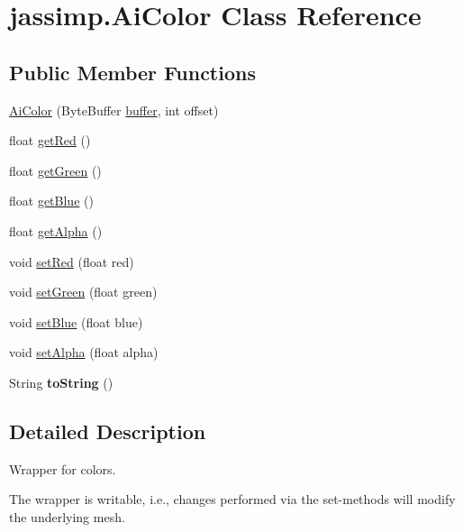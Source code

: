 \hypertarget{classjassimp_1_1_ai_color}{\section{jassimp.\+Ai\+Color Class Reference}
\label{classjassimp_1_1_ai_color}
}
\subsection*{Public Member Functions}
\begin{DoxyCompactItemize}
\item 
\hyperlink{classjassimp_1_1_ai_color_ad541c020e9793504776c0176d603194b}{Ai\+Color} (Byte\+Buffer \hyperlink{structbuffer}{buffer}, int offset)
\item 
float \hyperlink{classjassimp_1_1_ai_color_a0ff56d427f6989f83e02602758e8222a}{get\+Red} ()
\item 
float \hyperlink{classjassimp_1_1_ai_color_a610254e9e466640095a3353e596fc782}{get\+Green} ()
\item 
float \hyperlink{classjassimp_1_1_ai_color_a938bb9ab972c7b7d76617ff3ab8fb5bb}{get\+Blue} ()
\item 
float \hyperlink{classjassimp_1_1_ai_color_a46cdee22f53c85043dd25f93bc32779c}{get\+Alpha} ()
\item 
void \hyperlink{classjassimp_1_1_ai_color_a582431d016e7b12148a1c56689ac94df}{set\+Red} (float red)
\item 
void \hyperlink{classjassimp_1_1_ai_color_ae9e0f565340372591ae59eaff43d1a3f}{set\+Green} (float green)
\item 
void \hyperlink{classjassimp_1_1_ai_color_a6b50ac001208b81fe24f451560022c83}{set\+Blue} (float blue)
\item 
void \hyperlink{classjassimp_1_1_ai_color_ada5a99fe9df53c4c5265578ca56da2fd}{set\+Alpha} (float alpha)
\item 
\hypertarget{classjassimp_1_1_ai_color_a7e952c73a09bf99a6d6636e009c79879}{String {\bfseries to\+String} ()}\label{classjassimp_1_1_ai_color_a7e952c73a09bf99a6d6636e009c79879}

\end{DoxyCompactItemize}


\subsection{Detailed Description}
Wrapper for colors.

The wrapper is writable, i.\+e., changes performed via the set-\/methods will modify the underlying mesh. 

